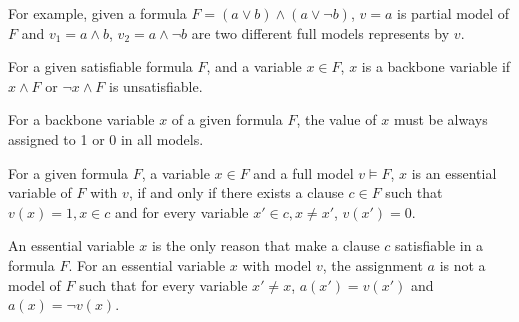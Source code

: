For example, given a formula $F=(a\vee b)\wedge(a\vee \neg b)$, $v=a$ is partial model of $F$ and $v_1=a\wedge b$, $v_2=a\wedge \neg b$ are two different full models represents by $v$.


\begin{definition}
For a given satisfiable formula $F$, and a variable $x\in F$, $x$ is a backbone variable if $x\wedge F$ or $\neg x \wedge F$ is unsatisfiable.
\end{definition}

\begin{lemma}
For a backbone variable $x$ of a given formula $F$, the value of $x$ must be always assigned to 1 or 0 in all models.
\end{lemma}

\begin{definition}
For a given formula $F$, a variable $x\in F$ and a full model $v\models F$, $x$ is an essential variable of $F$ with $v$, if and only if there exists a clause $c\in F$ such that $v(x)=1, x\in c$ and for every variable $x'\in c, x\neq x'$, $v(x')=0$. 
\end{definition}

An essential variable $x$ is the only reason that make a clause $c$ satisfiable in a formula $F$. For an essential variable $x$ with model $v$, the assignment $a$ is not a model of $F$ such that for every variable $x' \neq x $, $a(x')=v(x')$ and $a(x)=\neg v(x)$.
